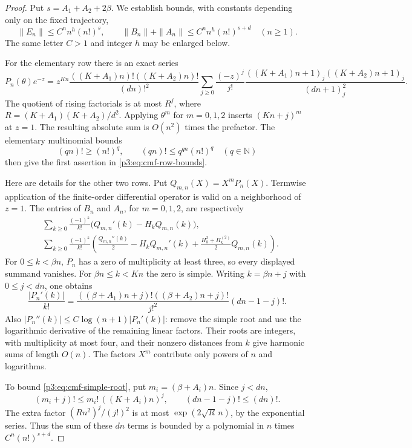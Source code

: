 \documentclass[11pt,a4paper]{article}
\theoremstyle{definition}
\theoremstyle{remark}
\numberwithin{equation}{section}
\begin{document}
\begin{proof}
Put $s=A_1+A_2+2\beta$. We establish bounds, with constants depending
only on the fixed trajectory,
\begin{equation}
 \|E_n\|\leq C^n n^h(n!)^s,\qquad
 \|B_n\|+\|A_n\|\leq C^n n^h(n!)^{s+d}
 \quad(n\geq1).
 \label{p3:eq:cmf-row-bounds}
\end{equation}
The same letter $C>1$ and integer $h$ may be enlarged below.

For the elementary row there is an exact series
\[
 P_n(\theta)e^{-z}
 =z^{Kn}\frac{((K+A_1)n)!((K+A_2)n)!}{(dn)!^2}
 \sum_{j\geq0}\frac{(-z)^j}{j!}
 \frac{((K+A_1)n+1)_j((K+A_2)n+1)_j}{(dn+1)_j^2}.
\]
The quotient of rising factorials is at most
$R^j$, where $R=(K+A_1)(K+A_2)/d^2$.
Applying $\theta^m$ for $m=0,1,2$ inserts $(Kn+j)^m$ at $z=1$.
The resulting absolute sum is $O(n^2)$ times the prefactor. The elementary
multinomial bounds
\[
 (qn)!\geq(n!)^q,\qquad (qn)!\leq q^{qn}(n!)^q\quad(q\in\mathbb N)
\]
then give the first assertion in \eqref{p3:eq:cmf-row-bounds}.

Here are details for the other two rows. Put $Q_{m,n}(X)=X^mP_n(X)$.
Termwise application of the finite-order differential operator is valid
on a neighborhood of $z=1$. The entries of $B_n$ and $A_n$, for
$m=0,1,2$, are respectively
\begin{align*}
 &\sum_{k\geq0}\frac{(-1)^k}{k!}
       \bigl(Q_{m,n}'(k)-H_k Q_{m,n}(k)\bigr),\\
 &\sum_{k\geq0}\frac{(-1)^k}{k!}
       \left(\frac{Q_{m,n}''(k)}2-H_kQ_{m,n}'(k)
              +\frac{H_k^2+H_k^{(2)}}2Q_{m,n}(k)\right).
\end{align*}
For $0\leq k<\beta n$, $P_n$ has a zero of multiplicity at least three,
so every displayed summand vanishes. For $\beta n\leq k<Kn$ the zero
is simple. Writing $k=\beta n+j$ with $0\leq j<dn$, one obtains
\begin{equation}
 \frac{|P_n'(k)|}{k!}
 =\frac{((\beta+A_1)n+j)!((\beta+A_2)n+j)!}{j!^2}
        (dn-1-j)!.
 \label{p3:eq:cmf-simple-root}
\end{equation}
Also $|P_n''(k)|\leq C\log(n+1)|P_n'(k)|$: remove the simple root
and use the logarithmic derivative of the remaining linear factors.
Their roots are integers, with multiplicity at most four, and their
nonzero distances from $k$ give harmonic sums of length $O(n)$.
The factors $X^m$ contribute only powers of $n$ and logarithms.

To bound \eqref{p3:eq:cmf-simple-root}, put
$m_i=(\beta+A_i)n$. Since $j<dn$,
\[
 (m_i+j)!\leq m_i!\,((K+A_i)n)^j,
 \qquad (dn-1-j)!\leq(dn)!.
\]
The extra factor $(Rn^2)^j/(j!)^2$ is at most $\exp(2\sqrt R\,n)$,
by the exponential series. Thus the sum of these $dn$ terms is bounded
by a polynomial in $n$ times $C^n(n!)^{s+d}$.


\end{proof}
\end{document}
